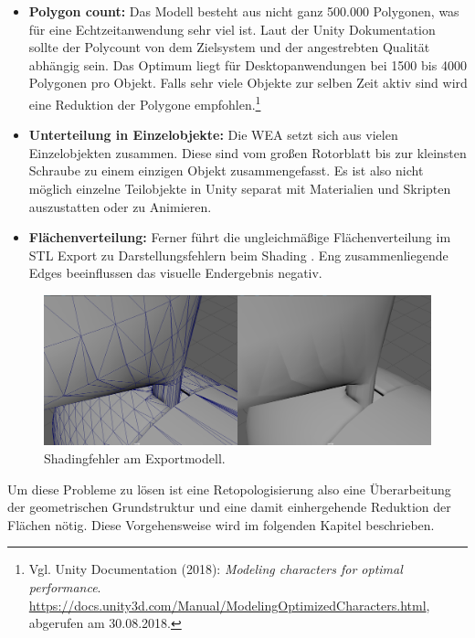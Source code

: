 \begin{itemize}
\item \textbf{Polygon count:} Das Modell besteht aus nicht ganz 500.000 Polygonen, was für eine Echtzeitanwendung sehr viel ist. Laut der Unity Dokumentation sollte der Polycount von dem Zielsystem und der angestrebten Qualität abhängig sein. Das Optimum liegt für Desktopanwendungen bei 1500 bis 4000 Polygonen pro Objekt. Falls sehr viele Objekte zur selben Zeit aktiv sind wird eine Reduktion der Polygone empfohlen.\footnote{Vgl. Unity Documentation  (2018): \textit{Modeling characters for optimal performance}.\newline
\url{https://docs.unity3d.com/Manual/ModelingOptimizedCharacters.html},\newline 
abgerufen am 30.08.2018.}     

\item \textbf{Unterteilung in Einzelobjekte:} Die WEA setzt sich aus vielen Einzelobjekten zusammen. Diese sind vom großen Rotorblatt bis zur kleinsten Schraube zu einem einzigen Objekt zusammengefasst. Es ist also nicht möglich einzelne Teilobjekte in Unity separat mit Materialien und Skripten auszustatten oder zu Animieren.  

\item \textbf{Flächenverteilung:} Ferner führt die ungleichmäßige Flächenverteilung im STL Export zu Darstellungsfehlern beim Shading . Eng zusammenliegende Edges beeinflussen das visuelle Endergebnis negativ.
\end{itemize}

\begin{figure}[H]
	\centering
	\captionsetup{width=1\textwidth}
	\includegraphics[keepaspectratio, width=1\textwidth]{bildquellen/WEAfehlerhaftesshading}
	\caption{Shadingfehler am Exportmodell.}
	\label{fig:2.3}
\end{figure}

Um diese Probleme zu lösen ist eine Retopologisierung also eine Überarbeitung der geometrischen Grundstruktur und eine damit einhergehende Reduktion der Flächen nötig. Diese Vorgehensweise wird im folgenden Kapitel  beschrieben.

